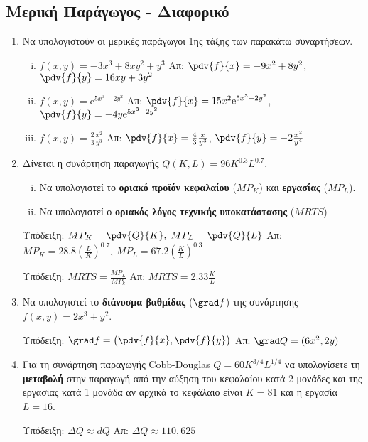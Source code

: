 \documentclass[a4paper,table]{report}
\begin{document}
\begin{center}
  \textcolor{Col1}{}
\end{center}

\vspace{\baselineskip}

\subsection*{Μερική Παράγωγος - Διαφορικό}

\begin{enumerate}
  \item Να υπολογιστούν οι μερικές παράγωγοι 1ης τάξης των παρακάτω συναρτήσεων.
    \begin{enumerate}[i)]
      \item $ f(x,y) = -3x^{3}+8xy^{2}+y^{3} $ 
        \hfill Απ: $ \pdv{f}{x} = -9x^{2}+8y^{2} $, $ \pdv{f}{y} = 16xy+3y^{2} $
      \item $ f(x,y) = \mathrm{e}^{5x^{3}-2y^{2}} $ \hfill Απ: $ \pdv{f}{x} = 15x^{2}
        \mathrm{e}^{5x^{3}-2y^{2}} $, $ \pdv{f}{y} = -4y \mathrm{e}^{5x^{3}-2y^{2}} $ 
      \item $ f(x,y) = \frac{2}{3} \frac{x^{2}}{y^{3}} $ \hfill Απ: $ \pdv{f}{x}
        = \frac{4}{3} \frac{x}{y^{3}} $, $ \pdv{f}{y} = -2 \frac{x^{2}}{y^{4}} $
    \end{enumerate}

  \item Δίνεται η συνάρτηση παραγωγής $ Q(K,L) = 96K^{0.3}L^{0.7} $.  
    \begin{enumerate}[i)]
      \item Να υπολογιστεί το \textbf{οριακό προϊόν κεφαλαίου} ($ MP_{K} $) και
        \textbf{εργασίας} ($ MP_{L} $).
      \item Να υπολογιστεί ο \textbf{οριακός λόγος τεχνικής υποκατάστασης} ($ MRTS $)
    \end{enumerate}
    \textcolor{Col1}{Υπόδειξη:} $ MP_{K} = \pdv{Q}{K}, 
    \; MP_{L} = \pdv{Q}{L} $  
    \hfill Απ: $ MP_{K} = 28.8 (\frac{L}{K})^{0.7} $, $ MP_{L} = 67.2
    (\frac{K}{L})^{0.3} $  

    \textcolor{Col1}{Υπόδειξη:} $ MRTS = \frac{MP_{L}}{MP_{k}} $
    \hfill Απ: $ MRTS = 2.33 \frac{K}{L} $  

  \item Να υπολογιστεί το \textbf{διάνυσμα βαθμίδας} ($ \grad f $) της συνάρτησης 
    $ f(x,y) = 2x^{3}+y^{2} $.

    \textcolor{Col1}{Υπόδειξη:} $ \grad f = \bigl(\pdv{f}{x} , \pdv{f}{y}\bigr) $ 
    \hfill Απ: $ \grad Q = (6x^{2},2y) $ 

  \item Για τη συνάρτηση παραγωγής Cobb-Douglas $ Q=60K^{3/4}L^{1/4} $ να
    υπολογίσετε τη \textbf{μεταβολή} στην παραγωγή από την αύξηση του κεφαλαίου 
    κατά 2 μονάδες και της εργασίας κατά 1 μονάδα αν αρχικά το κεφάλαιο είναι $ K=81 $ 
    και η εργασία $ L=16 $.

    \textcolor{Col1}{Υπόδειξη:} $ \Delta Q \approx dQ $
    \hfill Απ: $ \Delta Q \approx 110,625 $ 
\end{enumerate}
\end{document}
